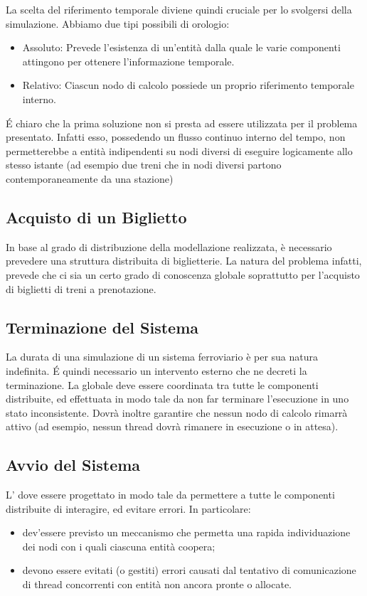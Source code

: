 	La scelta del riferimento temporale diviene quindi cruciale per lo svolgersi della simulazione. Abbiamo due tipi possibili di orologio:
		\begin{itemize}
			\item Assoluto: Prevede l'esistenza di un'entità dalla quale le varie componenti attingono per ottenere l'informazione temporale. 
			\item Relativo: Ciascun nodo di calcolo possiede un proprio riferimento temporale interno.
		\end{itemize}
		
	\'E chiaro che la prima soluzione non si presta ad essere utilizzata per il problema presentato. Infatti esso, possedendo un flusso continuo interno del tempo, non permetterebbe a entità indipendenti su nodi diversi di eseguire logicamente allo stesso istante (ad esempio due treni che in nodi diversi partono contemporaneamente da una stazione)

	\subsection{Acquisto di un Biglietto}
	
	In base al grado di distribuzione della modellazione realizzata, è necessario prevedere una struttura distribuita di biglietterie. La natura del problema infatti, prevede che ci sia un certo grado di conoscenza globale soprattutto per l'acquisto di biglietti di treni a prenotazione.

	\subsection{Terminazione del Sistema}
	
	La durata di una simulazione di un sistema ferroviario è per sua natura indefinita. \'E quindi necessario un intervento esterno che ne decreti la terminazione.	La  globale deve essere coordinata tra tutte le componenti distribuite, ed effettuata in modo tale da non far terminare l'esecuzione in uno stato inconsistente. Dovrà inoltre garantire che nessun nodo di calcolo rimarrà attivo (ad esempio, nessun thread dovrà rimanere in esecuzione o in attesa).

	\subsection{Avvio del Sistema}
	
	L' dove essere progettato in modo tale da permettere a tutte le componenti distribuite di interagire, ed evitare errori. In particolare:
	\begin{itemize}
		\item dev'essere previsto un meccanismo che permetta una rapida individuazione dei nodi con i quali ciascuna entità coopera;
		\item devono essere evitati (o gestiti) errori causati dal tentativo di comunicazione di thread concorrenti con entità non ancora pronte o allocate.
	\end{itemize} 
	

